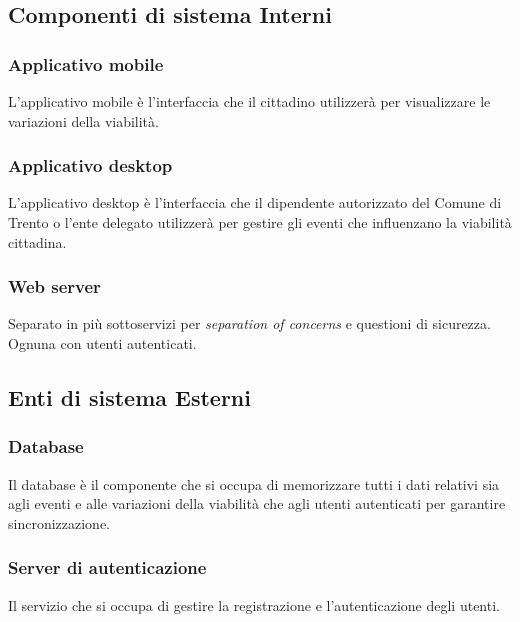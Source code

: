 \documentclass{article}
\begin{document}
\subsection{Componenti di sistema Interni}

\subsubsection{Applicativo mobile}
\label{3.3.1}
L'applicativo mobile è l'interfaccia che il cittadino utilizzerà per visualizzare le variazioni della viabilità.

\subsubsection{Applicativo desktop}
\label{3.3.2}
L'applicativo desktop è l'interfaccia che il dipendente autorizzato del Comune di Trento o l'ente delegato utilizzerà per gestire gli eventi che influenzano la viabilità cittadina.

\subsubsection{Web server}
\label{3.3.3}
Separato in più sottoservizi per \textit{separation of concerns} e questioni di sicurezza.
Ognuna con utenti autenticati.

\subsection{Enti di sistema Esterni}

\subsubsection{Database}
\label{3.3.4}
Il database è il componente che si occupa di memorizzare tutti i dati relativi sia agli eventi e alle variazioni della viabilità che agli utenti autenticati per garantire sincronizzazione.

\subsubsection{Server di autenticazione}
\label{3.3.5}
Il servizio che si occupa di gestire la registrazione e l'autenticazione degli utenti.
\end{document}
